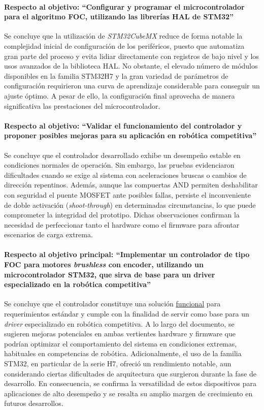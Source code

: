 \documentclass[11pt]{report}
\begin{document}
\paragraph{Respecto al objetivo: ``Configurar y programar el microcontrolador para el algoritmo FOC, utilizando las librerías HAL de STM32''} Se concluye que la utilización de \emph{STM32CubeMX} reduce de forma notable la complejidad inicial de configuración de los periféricos, puesto que automatiza gran parte del proceso y evita lidiar directamente con registros de bajo nivel y los usos avanzados de la biblioteca HAL. No obstante, el elevado número de módulos disponibles en la familia STM32H7 y la gran variedad de parámetros de configuración requirieron una curva de aprendizaje considerable para conseguir un ajuste óptimo. A pesar de ello, la configuración final aprovecha de manera significativa las prestaciones del microcontrolador.

\paragraph{Respecto al objetivo: ``Validar el funcionamiento del controlador y proponer posibles mejoras para su aplicación en robótica competitiva''} Se concluye que el controlador desarrollado exhibe un desempeño estable en condiciones normales de operación. Sin embargo, las pruebas evidenciaron dificultades cuando se exige al sistema con aceleraciones bruscas o cambios de dirección repentinos. Además, aunque las compuertas AND permiten deshabilitar con seguridad el puente MOSFET ante posibles fallas, persiste el inconveniente de doble activación (\emph{shoot-through}) en determinadas circunstancias, lo que puede comprometer la integridad del prototipo. Dichas observaciones confirman la necesidad de perfeccionar tanto el hardware como el firmware para afrontar escenarios de carga extrema.

\paragraph{Respecto al objetivo principal: ``Implementar un controlador de tipo FOC para motores \textit{brushless} con encoder, utilizando un microcontrolador STM32, que sirva de base para un driver especializado en la robótica competitiva''} Se concluye que el controlador constituye una solución \href{https://www.youtube.com/watch?v=XnAQtDEaI2I}{funcional} para requerimientos estándar y cumple con la finalidad de servir como base para un \emph{driver} especializado en robótica competitiva. A lo largo del documento, se sugieren mejoras potenciales en ambas vertientes hardware y firmware que podrían optimizar el comportamiento del sistema en condiciones extremas, habituales en competencias de robótica. Adicionalmente, el uso de la familia STM32, en particular de la serie H7, ofreció un rendimiento notable, aun considerando ciertas dificultades de arquitectura que surgieron durante la fase de desarrollo. En consecuencia, se confirma la versatilidad de estos dispositivos para aplicaciones de alto desempeño y se resalta su amplio margen de crecimiento en futuros desarrollos.
\end{document}
